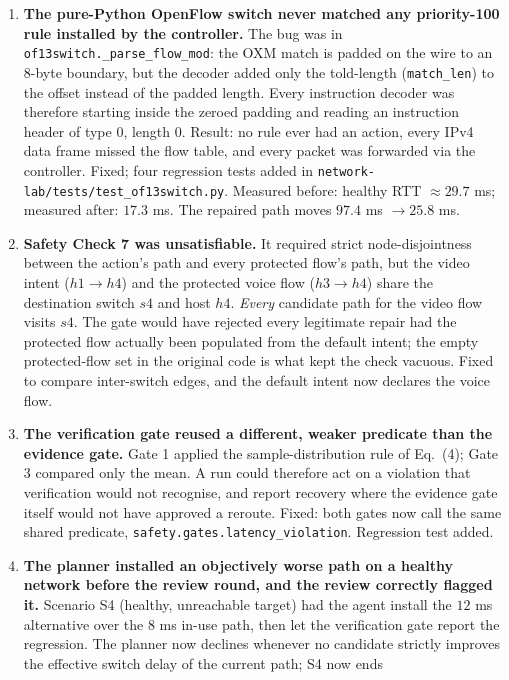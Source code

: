 \documentclass[11pt,a4paper]{article}
\begin{document}
\begin{enumerate}[leftmargin=1.5em]
\item \textbf{The pure-Python OpenFlow switch never matched any priority-100 rule
  installed by the controller.} The bug was in \texttt{of13switch.\_parse\_flow\_mod}:
  the OXM match is padded on the wire to an 8-byte boundary, but the decoder added
  only the told-length (\texttt{match\_len}) to the offset instead of the padded
  length. Every instruction decoder was therefore starting inside the zeroed
  padding and reading an instruction header of type 0, length 0. Result: no rule
  ever had an action, every IPv4 data frame missed the flow table, and every
  packet was forwarded via the controller. Fixed; four regression tests added in
  \texttt{network-lab/tests/test\_of13switch.py}. Measured before: healthy RTT
  $\approx 29.7$ ms; measured after: $17.3$ ms. The repaired path moves $97.4$ ms
  $\to 25.8$ ms.
\item \textbf{Safety Check 7 was unsatisfiable.} It required strict node-disjointness
  between the action's path and every protected flow's path, but the video intent
  ($h1\!\to\!h4$) and the protected voice flow ($h3\!\to\!h4$) share the
  destination switch $s4$ and host $h4$. \emph{Every} candidate path for the video
  flow visits $s4$. The gate would have rejected every legitimate repair had the
  protected flow actually been populated from the default intent; the empty
  protected-flow set in the original code is what kept the check vacuous. Fixed to
  compare inter-switch edges, and the default intent now declares the voice flow.
\item \textbf{The verification gate reused a different, weaker predicate than the
  evidence gate.} Gate 1 applied the sample-distribution rule of Eq.~(4);
  Gate 3 compared only the mean. A run could therefore act on a violation that
  verification would not recognise, and report recovery where the evidence gate
  itself would not have approved a reroute. Fixed: both gates now call the same
  shared predicate, \texttt{safety.gates.latency\_violation}. Regression test added.
\item \textbf{The planner installed an objectively worse path on a healthy
  network before the review round, and the review correctly flagged it.} Scenario
  S4 (healthy, unreachable target) had the agent install the $12$ ms
  alternative over the $8$ ms in-use path, then let the verification gate report
  the regression. The planner now declines whenever no candidate strictly
  improves the effective switch delay of the current path; S4 now ends

\end{enumerate}
\end{document}
